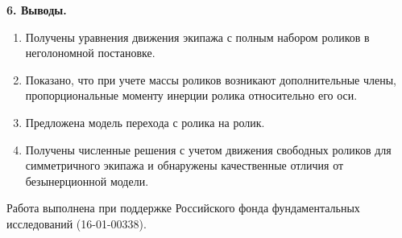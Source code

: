 

{\bf 6. Выводы.}
\begin{enumerate}[wide]
    \item Получены уравнения движения экипажа с полным набором роликов в неголономной постановке.

    \item Показано, что при учете массы роликов возникают дополнительные члены, пропорциональные моменту инерции ролика относительно его оси.

    \item Предложена модель перехода с ролика на ролик.

    \item Получены численные решения с учетом движения свободных роликов для симметричного экипажа и обнаружены качественные отличия от безынерционной модели.
\end{enumerate}

Работа выполнена при поддержке Российского фонда фундаментальных исследований (16-01-00338).

